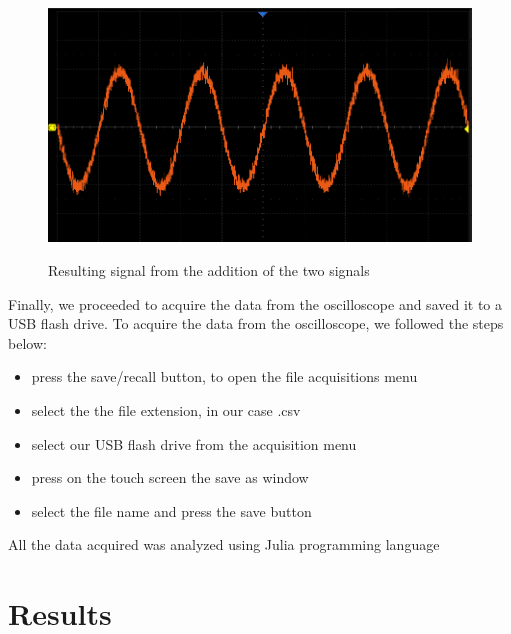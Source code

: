 \documentclass[a4paper,12pt]{article}
\begin{document}
\begin{figure}[H]
    \vspace{0.5cm} %
    \begin{minipage}[b]{0.45\linewidth} %
        \centering
        \includegraphics[width=\linewidth]{noise_signal.png}
        \label{fig:sin+noise_signal}
        \caption{Resulting signal from the addition of the two signals} 
    \end{minipage}
    
\end{figure}
Finally, we proceeded to acquire the data from the oscilloscope and saved it to a USB flash drive.
To acquire the data from the oscilloscope, we followed the steps below:
\begin{itemize}
    \item press the save/recall button, to open the file acquisitions menu
    \item select the the file extension, in our case .csv
    \item select our USB flash drive from the acquisition menu
    \item press on the touch screen the save as window
    \item select the file name and press the save button
\end{itemize}
All the data acquired was analyzed using Julia programming language 
 







\newpage






\section{Results}
\end{document}
